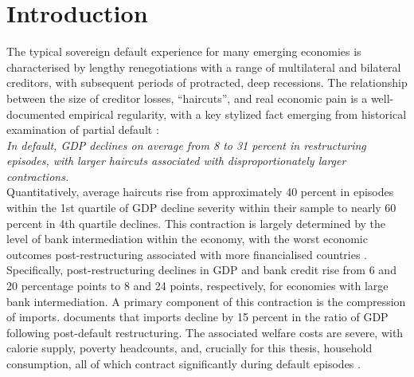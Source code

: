 \documentclass[11pt]{article}
\theoremstyle{definition}
\theoremstyle{plain}
\theoremstyle{remark}
\begin{document}
\begin{titlepage}
\begin{abstract}
    \vspace{1cm} %
    
    \noindent\textbf{Keywords:} Renegotiation, Costly state verification, Sovereign-bank nexus, Import compression, Small open economy, Sri Lanka. \\[0.2cm]
    \textbf{JEL Classification:} F34, F41, G21, E44. \\[0.2cm]
    \noindent\textbf{Word Count:} 15,418. 
\end{abstract}
  


\clearpage
\end{titlepage}

\tableofcontents

\newpage


\section{Introduction} \label{sec:intro}

The typical sovereign default experience for many emerging economies is characterised by lengthy renegotiations with a range of multilateral and bilateral creditors, with subsequent periods of protracted, deep recessions. The relationship between the size of creditor losses, “haircuts”, and real economic pain is a well-documented empirical regularity, with a key stylized fact emerging from historical examination of partial default \citep{graf_von_luckner_sovereign_2024}: \\

\noindent\textit{In default, GDP  declines on average from 8 to 31 percent in restructuring episodes, with larger haircuts associated with disproportionately larger contractions.}\\

Quantitatively, average haircuts rise from approximately 40 percent in episodes within the 1st quartile of GDP decline severity within their sample to nearly 60 percent in 4th quartile declines. This contraction is largely determined by the level of bank intermediation within the economy, with the worst economic outcomes post-restructuring associated with more financialised countries \citep{asonuma_costs_2024}. Specifically, post-restructuring declines in GDP and bank credit rise from 6 and 20 percentage points to 8 and 24 points, respectively, for economies with large bank intermediation. A primary component of this contraction is the compression of imports. \citet{asonuma_trade_2025} documents that imports decline by 15 percent in the ratio of GDP following post-default restructuring. The associated welfare costs are severe, with calorie supply, poverty headcounts, and, crucially for this thesis, household consumption, all of which contract significantly during default episodes \citep{farah-yacoub_social_2024}.
\end{document}
